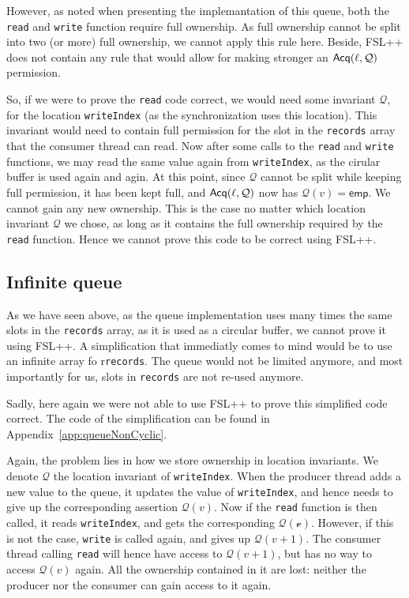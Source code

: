 However, as noted when presenting the implemantation of this queue, both the \texttt{read} and \texttt{write} function require full ownership. As full ownership cannot be split into two (or more) full ownership, we cannot apply this rule here. Beside, FSL++ does not contain any rule that would allow for making stronger an $\operatorname{\mathsf{Acq}}(\ell, \mathcal{Q})$ permission. 

So, if we were to prove the \texttt{read} code correct, we would need some invariant $\mathcal{Q}$, for the location \texttt{writeIndex} (as the synchronization uses this location). This invariant would need to contain full permission for the slot in the \texttt{records} array that the consumer thread can read. Now after some calls to the \texttt{read} and \texttt{write} functions, we may read the same value again from \texttt{writeIndex}, as the cirular buffer is used again and agin. At this point, since $\mathcal{Q}$ cannot be split while keeping full permission, it has been kept full, and $\operatorname{\mathsf{Acq}}(\ell, \mathcal{Q})$ now has $\mathcal{Q}(v) = \mathsf{emp}$. We cannot gain any new ownership. This is the case no matter which location invariant $\mathcal{Q}$ we chose, as long as it contains the full ownership required by the \texttt{read} function. Hence we cannot prove this code to be correct using FSL++.

\subsection{Infinite queue}
As we have seen above, as the queue implementation uses many times the same slots in the \texttt{records} array, as it is used as a circular buffer, we cannot prove it using FSL++. A simplification that immediatly comes to mind would be to use an infinite array fo r\texttt{records}. The queue would not be limited anymore, and most importantly for us, slots in \texttt{records} are not re-used anymore.

Sadly, here again we were not able to use FSL++ to prove this simplified code correct. The code of the simplification can be found in Appendix~\ref{app:queueNonCyclic}. 

Again, the problem lies in how we store ownership in location invariants. We denote $\mathcal{Q}$ the location invariant of \texttt{writeIndex}. When the producer thread adds a new value to the queue, it updates the value of \texttt{writeIndex}, and hence needs to give up the corresponding assertion $\mathcal{Q}(v)$. Now if the \texttt{read} function is then called, it reads \texttt{writeIndex}, and gets the corresponding $\mathcal{Q(v)}$. However, if this is not the case, \texttt{write} is called again, and gives up $\mathcal{Q}(v + 1)$. The consumer thread calling \texttt{read} will hence have access to $\mathcal{Q}(v + 1)$, but has no way to access $\mathcal{Q}(v)$ again. All the ownership contained in it are lost: neither the producer nor the consumer can gain access to it again.

